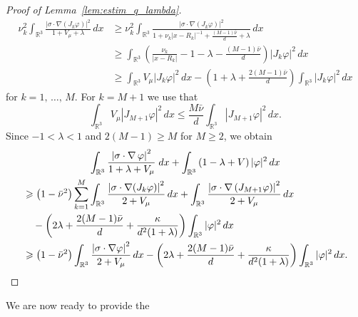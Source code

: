 \documentclass[10pt]{amsart}
\theoremstyle{definition}
\newcommand{\R}{\mathbb{R}}
\newcommand\1{{\ensuremath {\mathds 1} }}
\renewcommand\phi{\varphi}
\renewcommand{\geq}{\geqslant}
\begin{document}
\begin{proof}[Proof of Lemma~\ref{lem:estim_q_lambda}]
\begin{equation}
\begin{aligned}
\nu_k^2\int_{\R^3}\frac{\left|\sigma\cdot \nabla (J_k\phi)\right|^2}{1+V_\mu+\lambda}\,dx &\geq \nu_k^2\int_{\R^3}\frac{\left|\sigma\cdot \nabla(J_k\phi)\right|^2}{1+\nu_k\left|x-R_k\right|^{-1}+\frac{(M-1)\bar\nu}{d}+\lambda}\,dx\\
&\geq \int_{\R^3}\left(\frac{\nu_k}{\left|x-R_k\right|}-1-\lambda-\frac{(M-1)\bar\nu}{d}\right)\left|J_k\phi\right|^2\,dx\\
&\geq \int_{\R^3}V_\mu\left|J_k\phi\right|^2\,dx-\left(1+\lambda+\frac{2(M-1)\bar\nu}{d}\right)\int_{\R^3}\left|J_k\phi\right|^2\,dx
\end{aligned}
\end{equation}
for $k=1,\,\dots,\,M$. For $k=M+1$ we use that
\[
\int_{\R^3}V_\mu\left|J_{M+1}\phi\right|^2\,dx \le \frac{M\bar\nu}{d} \int_{\R^3}\left|J_{M+1}\phi\right|^2\,dx.
\]
Since $-1<\lambda<1$ and $2(M-1)\geq M$ for $M\geq2$, we obtain
\begin{multline}\label{eq:estim_q_lambda}
\int_{\R^3}\frac{\left|\sigma\cdot\nabla\,\phi\right|^2}{1+\lambda+V_\mu}\;dx +\int_{\R^3}\left(1-\lambda+V\right)|\phi|^2\,dx\\
\begin{aligned}
& \geq\left(1-\bar\nu^2\right)\sum_{k=1}^M\int_{\R^3}\frac{\left|\sigma\cdot \nabla (J_k\phi)\right|^2}{2+V_\mu}\,dx+\int_{\R^3}\frac{\left|\sigma\cdot \nabla \left(J_{M+1}\phi\right)\right|^2}{2+V_\mu}\,dx\\
& \quad-\left(2\lambda+\frac{2(M-1)\bar\nu}{d}+\frac{\kappa}{d^2(1+\lambda)}\right)\int_{\R^3}|\phi|^2\,dx\\
& \geq\left(1-\bar\nu^2\right)\int_{\R^3}\frac{\left|\sigma\cdot \nabla \phi\right|^2}{2+V_\mu}\,dx-\left(2\lambda+\frac{2(M-1)\bar\nu}{d}+\frac{\kappa}{d^2(1+\lambda)}\right)\int_{\R^3}|\phi|^2\,dx.\qedhere
\end{aligned}
\end{multline}
\end{proof}

\goodbreak
We are now ready to provide the
\end{document}

